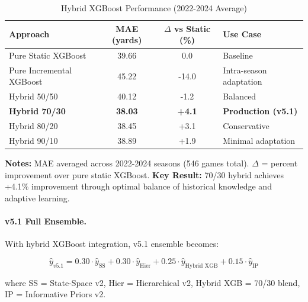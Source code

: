 \begin{table}[htbp]
\centering
\caption{Hybrid XGBoost Performance (2022-2024 Average)}
\label{tab:hybrid-xgb-performance}
\small
\begin{tabular}{@{} l S[table-format=2.2] S[table-format=2.1] l @{}}
\toprule
\textbf{Approach} & \textbf{MAE (yards)} & \textbf{$\Delta$ vs Static (\%)} & \textbf{Use Case} \\
\midrule
Pure Static XGBoost & 39.66 & 0.0 & Baseline \\
Pure Incremental XGBoost & 45.22 & -14.0 & Intra-season adaptation \\
Hybrid 50/50 & 40.12 & -1.2 & Balanced \\
\textbf{Hybrid 70/30} & \textbf{38.03} & \textbf{+4.1} & \textbf{Production (v5.1)} \\
Hybrid 80/20 & 38.45 & +3.1 & Conservative \\
Hybrid 90/10 & 38.89 & +1.9 & Minimal adaptation \\
\bottomrule
\end{tabular}

\vspace{2mm}
\begin{minipage}{\linewidth}
\small
\textbf{Notes:} MAE averaged across 2022-2024 seasons (546 games total). $\Delta$ = percent improvement over pure static XGBoost. \textbf{Key Result:} 70/30 hybrid achieves +4.1\% improvement through optimal balance of historical knowledge and adaptive learning.
\end{minipage}
\end{table}

\paragraph{v5.1 Full Ensemble.}
With hybrid XGBoost integration, v5.1 ensemble becomes:

\begin{equation}
\label{eq:v5p1-ensemble}
\hat{y}_{v5.1} = 0.30 \cdot \hat{y}_{\text{SS}} + 0.30 \cdot \hat{y}_{\text{Hier}} + 0.25 \cdot \hat{y}_{\text{Hybrid XGB}} + 0.15 \cdot \hat{y}_{\text{IP}}
\end{equation}

\noindent where SS = State-Space v2, Hier = Hierarchical v2, Hybrid XGB = 70/30 blend, IP = Informative Priors v2.

